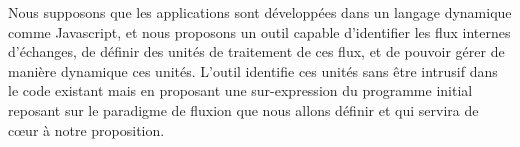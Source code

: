 Nous supposons que les applications sont développées dans un langage dynamique comme Javascript, et nous proposons un outil capable d'identifier les flux internes d'échanges, de définir des unités de traitement de ces flux, et de pouvoir gérer de manière dynamique ces unités.
L'outil identifie ces unités sans être intrusif dans le code existant mais en proposant une sur-expression du programme initial reposant sur le paradigme de fluxion que nous allons définir et qui servira de cœur à notre proposition.

